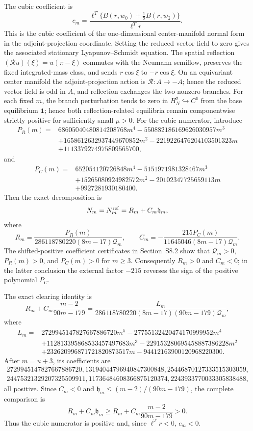 \documentclass[10pt]{article}
\newcommand{\1}{\mathbf1}
\begin{document}
The cubic coefficient is
\[
 c_m=\frac{\ell^T\{B(r,w_0)+\tfrac12B(r,w_2)\}}{\ell^Tr}.
\]
This is the cubic coefficient of the one-dimensional center-manifold normal
form in the adjoint-projection coordinate.  Setting the reduced vector field
to zero gives the associated stationary Lyapunov--Schmidt equation.  The
spatial reflection $(\mathcal Ru)(\xi)=u(\pi-\xi)$ commutes with the Neumann
semiflow, preserves the fixed integrated-mass class, and sends
$r\cos\xi$ to $-r\cos\xi$.  On an equivariant center manifold the
adjoint-projection action is $\mathcal R:A\mapsto-A$; hence the reduced vector
field is odd in $A$, and reflection exchanges the two nonzero branches.
For each fixed $m$, the branch perturbation tends to zero in
$H_N^2\hookrightarrow C^0$ from the base equilibrium $\1$; hence both
reflection-related equilibria remain componentwise strictly positive for
sufficiently small $\mu>0$.
For the cubic numerator, introduce
\begin{align*}
 P_R(m)={}&68605040480814208768m^4
 -550882186169626030957m^3\\
 &+1658612632937449670852m^2
 -2219226476204103501323m\\
 &+1113379274975809565700,
\end{align*}
and
\begin{align*}
 P_C(m)={}&652054120726848m^4
 -5151971981328467m^3\\
 &+15265080924982572m^2
 -20102347725659113m\\
 &+9927281930180400.
\end{align*}
Then the exact decomposition is
\[
 N_m=N_m^{\rm ref}=R_m+C_m\mathfrak h_m,
\]
where
\[
 R_m=\frac{P_R(m)}
 {286118780220(8m-17)\mathcal Q_m},
 \qquad
 C_m=-\frac{215P_C(m)}
 {11645046(8m-17)\mathcal Q_m}.
\]
The shifted-positive coefficient certificates in Section~S8.2 show that
$\mathcal Q_m>0$, $P_R(m)>0$, and $P_C(m)>0$ for $m\ge3$.
Consequently $R_m>0$ and $C_m<0$; in the latter conclusion the external
factor $-215$ reverses the sign of the positive polynomial $P_C$.

The exact clearing identity is
\[
 R_m+C_m\frac{m-2}{90m-179}
 =\frac{L_m}
 {286118780220(8m-17)(90m-179)\mathcal Q_m},
\]
where
\begin{align*}
L_m={}&2729945147827667886720m^5
-27755132420474170999952m^4\\
&+112813395868533457497683m^3
-229153280695458887386228m^2\\
&+232620996871721820873517m
-94412163900120968220300.
\tag{S6.1}\label{eq:Lmpoly}
\end{align*}
After $m=u+3$, its coefficients are
\begin{gather*}
2729945147827667886720,
13194044796940847300848,
25446870127333515303059,\\
24475321329207325509911,
11736484608366875120374,
2243933770033305838488,
\end{gather*}
all positive.  Since $C_m<0$ and
$\mathfrak h_m\le(m-2)/(90m-179)$, the complete comparison is
\[
 R_m+C_m\mathfrak h_m
 \ge R_m+C_m\frac{m-2}{90m-179}>0.
\]
Thus the cubic numerator is positive and, since $\ell^Tr<0$, $c_m<0$.
\end{document}
